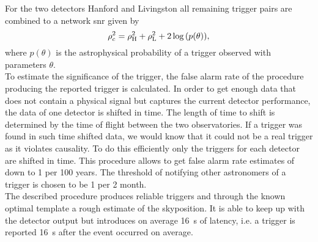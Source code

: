 For the two detectors Hanford and Livingston all remaining trigger pairs are combined to a network \gls{snr} given by
\begin{equation}
\rho_c^2=\rho_\text{H}^2 + \rho_\text{L}^2 + 2\log{\left( p(\theta) \right)},
\end{equation}
where $p(\theta)$ is the astrophysical probability of a trigger observed with parameters $\theta$.\medskip\\
To estimate the significance of the trigger, the false alarm rate of the procedure producing the reported trigger is calculated. In order to get enough data that does not contain a physical signal but captures the current detector performance, the data of one detector is shifted in time. The length of time to shift is determined by the time of flight between the two observatories. If a trigger was found in such time shifted data, we would know that it could not be a real trigger as it violates causality. To do this efficiently only the triggers for each detector are shifted in time. This procedure allows to get false alarm rate estimates of down to 1 per 100 years. The threshold of notifying other astronomers of a trigger is chosen to be 1 per 2 month.\medskip\\
The described procedure produces reliable triggers and through the known optimal template a rough estimate of the skyposition. It is able to keep up with the detector output but introduces on average \SI{16}{\s} of latency, i.e. a trigger is reported \SI{16}{\s} after the event occurred on average.
\begin{comment}
This estimate of the \gls{psd} is also used to detect drifts in the detector noise. Based on this, estimates of poor detector sensitivity and unusually high \gls{snr} values, some data is vetoed and not used for further analysis.
where $h$ is the template. To generate triggers from this time series a threshold of $\sim 5.5$ is applied to the output and several consistency tests are applied. These tests are applied to counteract the influence of non-Gaussian noise sections, \\
\textcolor{red}{Can keep up with live data stream but adds on average 16 seconds of latency, i.e. triggers are generated 16s after the data came in. Pipeline treats every detector on its own and combines the results. Make cuts based on data quality which is estimated by estimating the PSD.}
\end{comment}